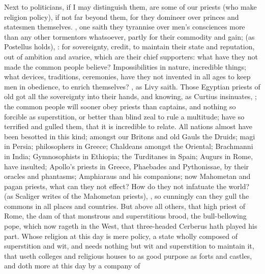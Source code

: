 {Next to politicians, if I may distinguish them, are some of our priests
(who make religion policy), if not far beyond them, for they domineer
over princes and statesmen themselves. , one saith
they tyrannise over men's consciences more than any other tormentors
whatsoever, partly for their commodity and gain;  (as Postellus holds), : for sovereignty, credit, to maintain their state and
reputation, out of ambition and avarice, which are their chief
supporters: what have they not made the common people believe?
Impossibilities in nature, incredible things; what devices, traditions,
ceremonies, have they not invented in all ages to keep men in
obedience, to enrich themselves? , as Livy saith. Those Egyptian priests of old
got all the sovereignty into their hands, and knowing, as Curtius
insinuates, ; the common people will sooner obey priests than
captains, and nothing so forcible as superstition, or better than blind
zeal to rule a multitude; have so terrified and gulled them, that it is
incredible to relate. All nations almost have been besotted in this
kind; amongst our Britons and old Gauls the Druids; magi in Persia;
philosophers in Greece; Chaldeans amongst the Oriental; Brachmanni in
India; Gymnosophists in Ethiopia; the Turditanes in Spain; Augurs in
Rome, have insulted; Apollo's priests in Greece, Phaebades and
Pythonissae, by their oracles and phantasms; Amphiaraus and his
companions; now Mahometan and pagan priests, what can they not effect?
How do they not infatuate the world?  (as Scaliger
writes of the Mahometan priests), , so
cunningly can they gull the commons in all places and countries. But
above all others, that high priest of Rome, the dam of that monstrous
and superstitious brood, the bull-bellowing pope, which now rageth in
the West, that three-headed Cerberus hath played his part.  Whose
religion at this day is mere policy, a state wholly composed of
superstition and wit, and needs nothing but wit and superstition to
maintain it, that useth colleges and religious houses to as good
purpose as forts and castles, and doth more at this day by a company of
}

